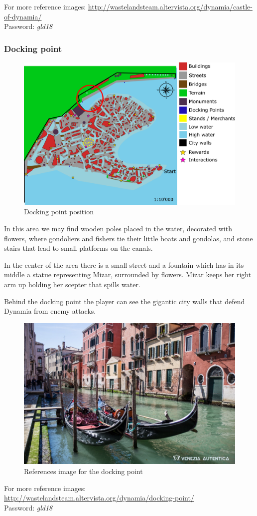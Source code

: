 For more reference images: \url{http://wastelandsteam.altervista.org/dynamia/castle-of-dynamia/}\\
Password: \textit{gld18}

\subsubsection{Docking point}
\begin{figure}[H]
  \centering
  \includegraphics[width=12cm]{Images/Maps/dynamia_dockingPoint}
  \caption{Docking point position}
\end{figure}
  
In this area we may find wooden poles placed in the water, decorated with flowers, where gondoliers and fishers tie their little boats and gondolas, and  stone stairs that lead to small platforms on the canals.

In the center of the area there is a small street and a fountain which has in its middle a statue representing Mizar, surrounded by flowers. Mizar keeps her right arm up holding her scepter that spills water.

Behind the docking point the player can see the gigantic city walls that defend Dynamia from enemy attacks.

\begin{figure}[H]
  \centering
  \includegraphics[width=\textwidth]{Images/Landmarks/dockingPoint}
  \caption{References image for the docking point}
\end{figure}
For more reference images: \url{http://wastelandsteam.altervista.org/dynamia/docking-point/}\\
Password: \textit{gld18}
